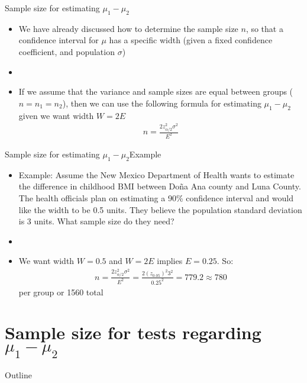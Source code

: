 \documentclass[xcolor=dvipsnames]{beamer}
\begin{document}
\begin{frame}{Sample size for estimating $\mu_1 - \mu_2$}
	\begin{itemize}
		\item We have already discussed how to determine the sample size $n$, so that a confidence interval for $\mu$ has a specific width (given a fixed confidence coefficient, and population $\sigma$) \pause
		\item[]
		\item If we assume that the variance and sample sizes are equal between groups ($n=n_1=n_2$), then we can use the following formula for estimating $\mu_1 - \mu_2$ given we want width $W = 2E$ 
		\begin{gather*}
			n = \frac{2 z_{\alpha / 2}^2 \sigma^2}{E^2}
		\end{gather*}
	\end{itemize}
\end{frame}

\begin{frame}{Sample size for estimating $\mu_1 - \mu_2$}{Example}
	\begin{itemize}
		\item Example: Assume the New Mexico Department of Health wants to estimate the difference in childhood BMI between Do\~{n}a Ana county and Luna County. The health officials plan on estimating a 90\% confidence interval and would like the width to be 0.5 units. They believe the population standard deviation is 3 units. What sample size do they need? \pause 
		\item[]
		\item We want width $W = 0.5$ and $W = 2E$ implies $E = 0.25$. So: \pause
		\begin{gather*}
		n = \frac{2 z_{\alpha / 2}^2 \sigma^2}{E^2} = \frac{2 (z_{0.05})^2 3^2}{0.25^2} = 779.2 \approx 780
		\end{gather*}
		per group or 1560 total
	\end{itemize}
\end{frame}

\section{Sample size for tests regarding $\mu_1 - \mu_2$}
\begin{frame}{Outline}
	\tableofcontents[currentsection,subsectionstyle=show/shaded/hide]
\end{frame}
\end{document}
